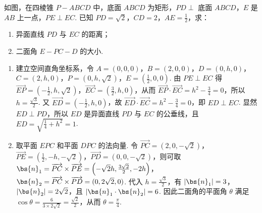 \begin{problem}
如图，在四棱锥 \(P - ABCD\) 中，底面 \(ABCD\) 为矩形，\(PD \perp\) 底面 \(ABCD\)，\(E\) 是 \(AB\) 上一点，\(PE \perp EC\). 已知 \(PD = \sqrt{2}\)，\(CD = 2\)，\(AE = \frac{1}{2}\)，求：

\begin{enumerate}
\item 异面直线 \(PD\) 与 \(EC\) 的距离；
\item 二面角 \(E - PC - D\) 的大小.
\end{enumerate}

\begin{solution}
\begin{enumerate}
\item 建立空间直角坐标系，令 \(A=(0,0,0)\)，\(B=(2,0,0)\)，\(D=(0,h,0)\)，\(C=(2,h,0)\)，\(P=(0,h,\sqrt2)\)，\(E=\left(\frac12,0,0\right)\). 由 \(PE\perp EC\) 得 \(\overrightarrow{EP}=\left(-\frac12,h,\sqrt2\right)\)，\(\overrightarrow{EC}=\left(\frac32,h,0\right)\)，从而 \(\overrightarrow{EP}\cdot\overrightarrow{EC}=h^2-\frac34=0\)，所以 \(h=\frac{\sqrt3}{2}\). 又 \(\overrightarrow{ED}=\left(-\frac12,h,0\right)\)，故 \(\overrightarrow{ED}\cdot\overrightarrow{EC}=h^2-\frac34=0\)，即 \(ED\perp EC\). 显然 \(ED\perp PD\)，所以 \(ED\) 是异面直线 \(PD\) 与 \(EC\) 的公垂线，且 \(ED=\sqrt{\frac14+h^2}=1\).
\item 取平面 \(EPC\) 和平面 \(DPC\) 的法向量. 令 \(\overrightarrow{PC}=(2,0,-\sqrt2)\)，\(\overrightarrow{PE}=\left(\frac12,-h,-\sqrt2\right)\)，\(\overrightarrow{PD}=(0,0,-\sqrt2)\)，则可取 \(\bs{n}_1=\overrightarrow{PC}\times\overrightarrow{PE}=\left(-\sqrt2h,\frac{3\sqrt2}{2},-2h\right)\)，\(\bs{n}_2=\overrightarrow{PC}\times\overrightarrow{PD}=(0,2\sqrt2,0)\). 代入 \(h=\frac{\sqrt3}{2}\)，有 \(|\bs{n}_1|=3\)，\(|\bs{n}_2|=2\sqrt2\)，且 \(|\bs{n}_1\cdot\bs{n}_2|=6\). 因此二面角的平面角 \(\theta\) 满足 \(\cos\theta=\frac{6}{3\times2\sqrt2}=\frac{\sqrt2}{2}\)，从而 \(\theta=\frac\pi4\).
\end{enumerate}
\end{solution}
\end{problem}

